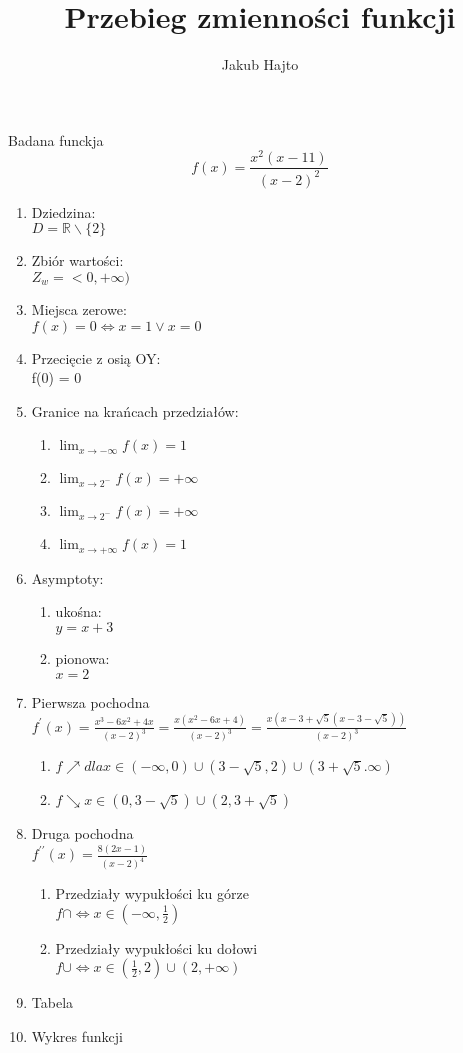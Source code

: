 \documentclass[11pt]{scrartcl}
\title{Przebieg zmienności funkcji}
\author{Jakub Hajto}
\begin{document}
	\maketitle
	\begin{center}
	Badana funckja $$ f(x) = \frac{x^2(x-11)}{(x-2)^2} $$
	\end{center}
	\begin{enumerate}  
		\item Dziedzina: \\
			$ D = \mathbb{R} \backslash \{2\} $
		\item Zbiór wartości: \\
			$ Z_w = <0, +\infty) $
		\item Miejsca zerowe: \\
			$ f(x) = 0 \Longleftrightarrow x = 1 \vee x = 0 $
		\item Przecięcie z osią OY: \\
			f(0) = 0
		\item Granice na krańcach przedziałów:
			\begin{enumerate}
				\item $ \lim_{x\to-\infty} f(x) = 1 $
				\item $ \lim_{x\to2^-} f(x) = +\infty $
				\item $ \lim_{x\to2^-} f(x) = +\infty $
				\item $ \lim_{x\to+\infty} f(x) = 1 $
			\end{enumerate}
		\item Asymptoty:
			\begin{enumerate}
				\item ukośna: \\
					$ y = x + 3$
				\item pionowa: \\
					$ x=2 $
			\end{enumerate}
		\item Pierwsza pochodna \\
			$ f^{\prime}(x) = \frac{x^3 -6x^2 +4x}{(x-2)^3} =  \frac{x(x^2 -6x +4)}{(x-2)^3}=  \frac{x(x - 3 + \sqrt{5}(x - 3 - \sqrt{5}))}{(x-2)^3} $
			\begin{enumerate}
				\item $ f\nearrow dla x \in (-\infty, 0) \cup (3-\sqrt{5}, 2) \cup ( 3+\sqrt{5}. \infty) $
				\item $ f\searrow x \in ( 0, 3-\sqrt{5}) \cup (2 , 3+\sqrt{5}) $
			\end{enumerate}
		\item Druga pochodna \\
			$ f^{\prime\prime}(x) = \frac{8(2x-1)}{(x-2)^4} $
			\begin{enumerate}
				\item Przedziały wypukłości ku górze \\
				$ f\cap \Leftrightarrow x \in (-\infty, \frac{1}{2}) $
				\item Przedziały wypukłości ku dołowi \\
				$ f\cup \Leftrightarrow x \in (\frac{1}{2},2) \cup (2, +\infty) $
			\end{enumerate}
		\item Tabela
		\item Wykres funkcji
	\end{enumerate}

	
\end{document}
